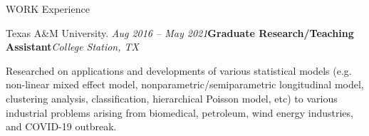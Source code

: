 \documentclass[
	11pt, %
]{resume} %
\begin{document}
\begin{rSection}{WORK Experience}
\begin{rSubsection}{Texas A\&M University.
}{\em Aug 2016 -- May 2021}{\textbf{Graduate Research/Teaching Assistant}}{\em College Station, TX}
\item 
Researched on applications and developments of various statistical models (e.g. non-linear mixed effect model, nonparametric/semiparametric longitudinal model, clustering analysis, classification, hierarchical Poisson model, etc) to various industrial problems arising from biomedical, petroleum, wind energy industries, and COVID-19 outbreak.
\end{rSubsection}


\end{rSection}

\end{document}

